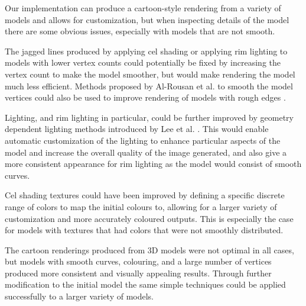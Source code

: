 Our implementation can produce a cartoon-style rendering from a variety of models and 
allows for customization, but when inspecting details of the model there are some obvious 
issues, especially with models that are not smooth.

The jagged lines produced by applying cel shading or applying rim lighting to models with 
lower vertex counts could potentially be fixed by increasing the vertex count to make the model 
smoother, but would make rendering the model much less efficient. Methods proposed by Al-Rousan et 
al. to smooth the model vertices could also be used to improve rendering of models with rough 
edges \cite{rousan16}. 

Lighting, and rim lighting in particular, could be further improved by geometry dependent 
lighting methods introduced by Lee et al. \cite{lee06}. This would enable automatic customization 
of the lighting to enhance particular aspects of the model and increase the overall quality of 
the image generated, and also give a more consistent appearance for rim lighting as the model 
would consist of smooth curves.

Cel shading textures could have been improved by defining a specific discrete range of colors 
to map the initial colours to, allowing for a larger variety of customization and more accurately 
coloured outputs. This is especially the case for models with textures that had colors that were 
not smoothly distributed.

The cartoon renderings produced from 3D models were not optimal in all cases, but models with 
smooth curves, colouring, and a large number of vertices produced more consistent and visually 
appealing results. Through further modification to the initial model the same simple techniques 
could be applied successfully to a larger variety of models.
